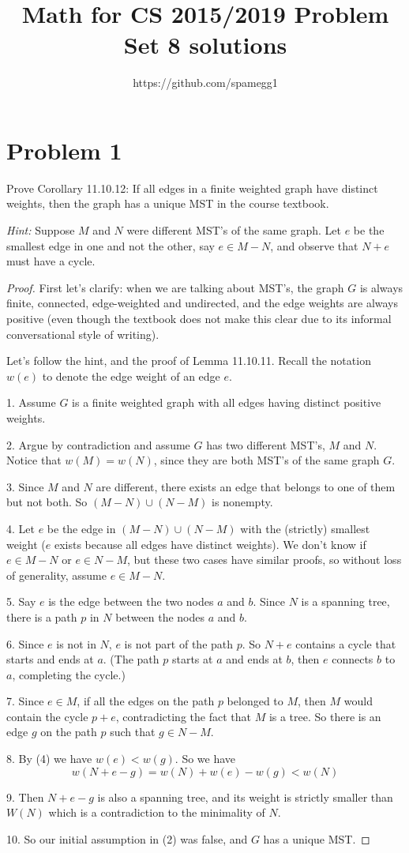 \documentclass[14pt]{extarticle}
\title{Math for CS 2015/2019 Problem Set 8 solutions}
\author{https://github.com/spamegg1}
\begin{document}
\maketitle
\tableofcontents

\section{Problem 1}
Prove Corollary 11.10.12: If all edges in a finite weighted graph have distinct weights, then the graph has a unique MST in the course textbook.

{\it Hint:} Suppose $M$ and $N$ were different MST’s of the same graph. Let $e$ be the smallest edge in one and not the other, say $e \in M - N$, and observe that $N + e$ must have a cycle.
\begin{proof}
First let's clarify: when we are talking about MST's, the graph $G$ is always finite, connected, edge-weighted and undirected, and the edge weights are always positive (even though the textbook does not make this clear due to its informal conversational style of writing).

Let's follow the hint, and the proof of Lemma 11.10.11. Recall the notation $w(e)$ to denote the edge weight of an edge $e$.

1. Assume $G$ is a finite weighted graph with all edges having distinct positive weights.

2. Argue by contradiction and assume $G$ has two different MST's, $M$ and $N$. Notice that $w(M) = w(N)$, since they are both MST's of the same graph $G$.

3. Since $M$ and $N$ are different, there exists an edge that belongs to one of them but not both. So $(M-N) \cup (N-M)$ is nonempty. 

4. Let $e$ be the edge in $(M-N) \cup (N-M)$ with the (strictly) smallest weight ($e$ exists because all edges have distinct weights). We don't know if $e \in M-N$ or $e \in N-M$, but these two cases have similar proofs, so without loss of generality, assume $e \in M-N$.

5. Say $e$ is the edge between the two nodes $a$ and $b$. Since $N$ is a spanning tree, there is a path $p$ in $N$ between the nodes $a$ and $b$.

6. Since $e$ is not in $N$, $e$ is not part of the path $p$. So $N + e$ contains a cycle that starts and ends at $a$. (The path $p$ starts at $a$ and ends at $b$, then $e$ connects $b$ to $a$, completing the cycle.)

7. Since $e \in M$, if all the edges on the path $p$ belonged to $M$, then $M$ would contain the cycle $p + e$, contradicting the fact that $M$ is a tree. So there is an edge $g$ on the path $p$ such that $g \in N-M$.

8. By (4) we have $w(e) < w(g)$. So we have
$$
w(N + e - g) = w(N) + w(e) - w(g) < w(N)
$$

9. Then $N + e - g$ is also a spanning tree, and its weight is strictly smaller than $W(N)$ which is a contradiction to the minimality of $N$.

10. So our initial assumption in (2) was false, and $G$ has a unique MST.
\end{proof}
\end{document}
